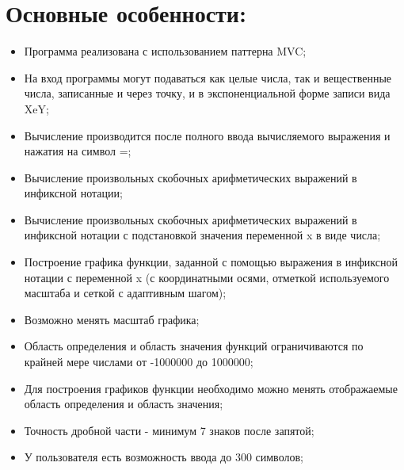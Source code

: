 \documentclass{report}
\begin{document}
\section* {\bfseries Основные особенности:}
\begin{itemize}
\item Программа реализована с использованием паттерна MVC;

\item На вход программы могут подаваться как целые числа, так и вещественные числа, записанные и через точку, и в экспоненциальной форме записи вида XeY;

\item Вычисление производится после полного ввода вычисляемого выражения и нажатия на символ =;

\item Вычисление произвольных скобочных арифметических выражений в инфиксной нотации;

\item Вычисление произвольных скобочных арифметических выражений в инфиксной нотации с подстановкой значения переменной x в виде числа;

\item Построение графика функции, заданной с помощью выражения в инфиксной нотации с переменной x  (с координатными осями, отметкой используемого масштаба и сеткой с адаптивным шагом);

\item Возможно менять масштаб графика;

\item Область определения и область значения функций ограничиваются по крайней мере числами от -1000000 до 1000000;

\item Для построения графиков функции необходимо можно менять отображаемые область определения и область значения;

\item Точность дробной части - минимум 7 знаков после запятой;

\item У пользователя есть возможность ввода до 300 символов;

\end{itemize}
\end{document}
